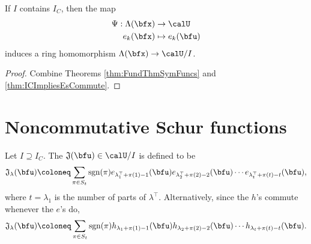 \documentclass{article}
\newcommand*\frkJ{\mathfrak{J}}
\newcommand*\sgn{\operatorname{sgn}}
\begin{document}
\begin{corollary}
    If $I$ contains $I_C$, then the map
    \begin{align*}
        \Psi:
        \Lambda(\bfx)
        &\to
        \calU
        \\
        e_k(\bfx)
        &\mapsto
        e_k(\bfu)
    \end{align*}
    induces a ring homomorphism $\Lambda(\bfx) \to \calU/I$.
\end{corollary}



\begin{proof}
    Combine Theorems \ref{thm:FundThmSymFuncs} and \ref{thm:ICImpliesEsCommute}.
\end{proof}



\section{
    Noncommutative Schur functions
}

\begin{definition}
    Let $I \supseteq I_C$.
    The  $\frkJ(\bfu) \in \calU/I$ is defined to be
    \[
        \frkJ_\lambda(\bfu)
        \coloneq
        \sum_{\pi \in S_{t}}
        \sgn(\pi)
        e_{\lambda^\top_1+\pi(1)-1}(\bfu)
        e_{\lambda^\top_2+\pi(2)-2}(\bfu)
        \cdots
        e_{\lambda^\top_{t}+\pi(t)-t}(\bfu),
    \]
    where $t = \lambda_1$ is the number of parts of $\lambda^\top$.
    Alternatively, since the $h$'s commute whenever the $e$'s do,
    \[
        \frkJ_\lambda(\bfu)
        \coloneq
        \sum_{\pi \in S_{t}}
        \sgn(\pi)
        h_{\lambda_1+\pi(1)-1}(\bfu)
        h_{\lambda_2+\pi(2)-2}(\bfu)
        \cdots
        h_{\lambda_t+\pi(t)-t}(\bfu).
    \]
\end{definition}
\end{document}
